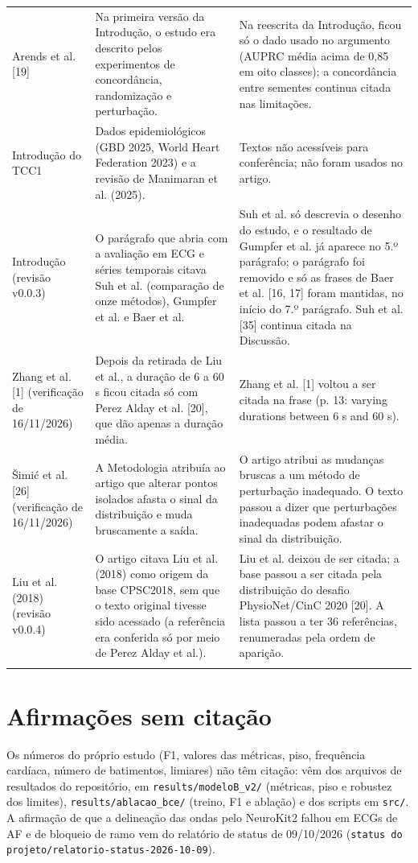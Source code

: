 \documentclass[11pt,a4paper]{article}
\begin{document}
\begin{longtable}{>{\raggedright\arraybackslash}p{3.0cm}>{\raggedright\arraybackslash}p{6.2cm}>{\raggedright\arraybackslash}p{7.2cm}}
\addlinespace
Arends et al. [19] & Na primeira versão da Introdução, o estudo era descrito pelos experimentos de concordância, randomização e perturbação. & Na reescrita da Introdução, ficou só o dado usado no argumento (AUPRC média acima de 0,85 em oito classes); a concordância entre sementes continua citada nas limitações. \\
\addlinespace
Introdução do TCC1 & Dados epidemiológicos (GBD 2025, World Heart Federation 2023) e a revisão de Manimaran et al. (2025). & Textos não acessíveis para conferência; não foram usados no artigo. \\
\addlinespace
Introdução (revisão v0.0.3) & O parágrafo que abria com a avaliação em ECG e séries temporais citava Suh et al. (comparação de onze métodos), Gumpfer et al. e Baer et al. & Suh et al. só descrevia o desenho do estudo, e o resultado de Gumpfer et al. já aparece no 5.º parágrafo; o parágrafo foi removido e só as frases de Baer et al. [16, 17] foram mantidas, no início do 7.º parágrafo. Suh et al. [35] continua citada na Discussão. \\
\addlinespace
Zhang et al. [1] (verificação de 16/11/2026) & Depois da retirada de Liu et al., a duração de 6 a 60 s ficou citada só com Perez Alday et al. [20], que dão apenas a duração média. & Zhang et al. [1] voltou a ser citada na frase (p. 13: varying durations between 6 s and 60 s). \\
\addlinespace
Šimić et al. [26] (verificação de 16/11/2026) & A Metodologia atribuía ao artigo que alterar pontos isolados afasta o sinal da distribuição e muda bruscamente a saída. & O artigo atribui as mudanças bruscas a um método de perturbação inadequado. O texto passou a dizer que perturbações inadequadas podem afastar o sinal da distribuição. \\
\addlinespace
Liu et al. (2018) (revisão v0.0.4) & O artigo citava Liu et al. (2018) como origem da base CPSC2018, sem que o texto original tivesse sido acessado (a referência era conferida só por meio de Perez Alday et al.). & Liu et al. deixou de ser citada; a base passou a ser citada pela distribuição do desafio PhysioNet/CinC 2020 [20]. A lista passou a ter 36 referências, renumeradas pela ordem de aparição. \\
\addlinespace
\bottomrule
\end{longtable}

\section{Afirmações sem citação}
Os números do próprio estudo (F1, valores das métricas, piso, frequência cardíaca, número de batimentos, limiares) não têm citação: vêm dos arquivos de resultados do repositório, em \texttt{results/modeloB\_v2/} (métricas, piso e robustez dos limites), \texttt{results/ablacao\_bce/} (treino, F1 e ablação) e dos scripts em \texttt{src/}. A afirmação de que a delineação das ondas pelo NeuroKit2 falhou em ECGs de AF e de bloqueio de ramo vem do relatório de status de 09/10/2026 (\texttt{status do projeto/relatorio-status-2026-10-09}).
\end{document}

